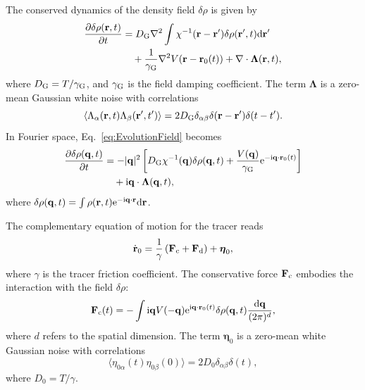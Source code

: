 \documentclass[pre, superscriptaddress, twocolumn,pre]{revtex4-1}
\newcommand{\dd}{\text{d}}
\newcommand{\ee}{\text{e}}
\newcommand{\ii}{\text{i}}
\begin{document}
The conserved dynamics of the density field $\delta\rho$ is given by
\begin{equation}\label{eq:EvolutionField}
	\begin{aligned}
		\frac{\partial \delta \rho({\bf r}, t)}{\partial t} &= D_{\rm G} \nabla^2 \int \chi^{-1} ({\bf r}-{\bf r}') \delta \rho({\bf r}', t) \dd{\bf r}'
		\\
		&\quad + \frac{1}{\gamma_{\rm G}} \nabla^2 V({\bf r}-{\bf r}_0(t)) + \nabla \cdot {\boldsymbol\Lambda}({\bf r},t) ,
	\end{aligned}
\end{equation}
where $D_{\rm G} = T/\gamma_{\rm G}$, and $\gamma_{\rm G}$ is the field damping coefficient. The term $\boldsymbol\Lambda$ is a zero-mean Gaussian white noise with correlations
\begin{equation}
	\langle \Lambda_\alpha({\bf r}, t) \Lambda_\beta({\bf r}', t') \rangle = 2 D_{\rm G} \delta_{\alpha\beta}\delta({\bf r} - {\bf r}')\delta(t-t') .
\end{equation}
In Fourier space, Eq.~\eqref{eq:EvolutionField} becomes
\begin{equation}\label{eq:FourierEvolutionField}
	\begin{aligned}
		\frac{\partial \delta \rho({\bf q},t)}{\partial t} &= - |{\bf q}|^2 \left[ D_{\rm G} \chi^{-1}({\bf q}) \delta \rho({\bf q},t) + \frac{V({\bf q})}{\gamma_{\rm G}} \ee^{-\ii {\bf q} \cdot {\bf r}_0(t)} \right]
		\\
		&\quad + \ii{\bf q}\cdot{\boldsymbol\Lambda} ({\bf q},t) ,
	\end{aligned}
\end{equation}
where $\delta\rho({\bf q},t)=\int\rho({\bf r},t){\rm e}^{-{\rm i}{\bf q}\cdot{\bf r}} {\rm d}{\bf r}$.


The complementary equation of motion for the tracer reads
\begin{equation}\label{eq:EvolutionTracer}
	\dot{\bf r}_0 = \frac{1}{\gamma} \left( {\bf F}_\text{c}+{\bf F}_\text{d} \right) + {\boldsymbol\eta_0} ,
\end{equation}
where $\gamma$ is the tracer friction coefficient. The conservative force ${\bf F}_\text{c}$ embodies the interaction with the field $\delta\rho$:
\begin{equation}
	{\bf F}_\text{c}(t) = - \int \ii{\bf q} V(-{\bf q})\ee^{\ii{\bf q} \cdot {\bf r}_0(t)} \delta \rho({\bf q}, t) \frac{\dd{\bf q}}{(2\pi)^d} ,
\end{equation}
where $d$ refers to the spatial dimension. The term ${\boldsymbol\eta}_0$ is a zero-mean white Gaussian noise with correlations
\begin{equation}
	\langle\eta_{0\alpha}(t)\eta_{0\beta}(0)\rangle = 2 D_0 \delta_{\alpha\beta}\delta(t) ,
\end{equation}
where $D_0 = T/\gamma$.
\end{document}
